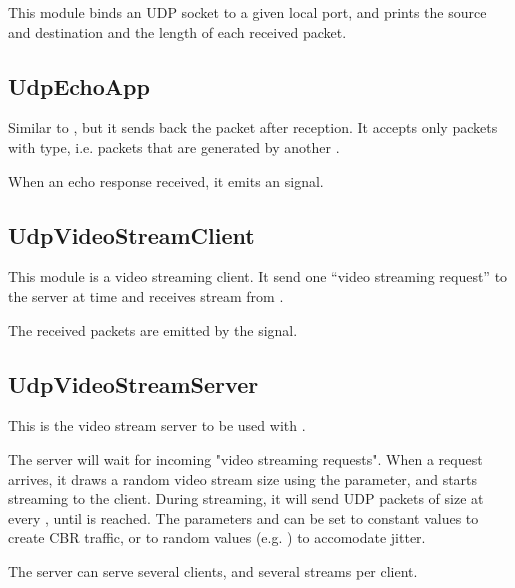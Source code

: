 This module binds an UDP socket to a given local port, and prints the
source and destination and the length of each received packet.


\subsection{UdpEchoApp}
\label{sec:apps:udpechoapp}

Similar to , but it sends back the packet after reception.
It accepts only packets with  type, i.e. packets that
are generated by another .

When an echo response received, it emits an  signal.

\subsection{UdpVideoStreamClient}
\label{sec:apps:udpvideostreamclient}

This module is a video streaming client. It send one ``video streaming request'' to
the server at time  and receives stream from .

The received packets are emitted by the  signal.

\subsection{UdpVideoStreamServer}
\label{sec:apps:udpvideostreamserver}

This is the video stream server to be used with .

The server will wait for incoming "video streaming requests".
When a request arrives, it draws a random video stream size
using the  parameter, and starts streaming to the client.
During streaming, it will send UDP packets of size  at every
, until  is reached. The parameters 
and  can be set to constant values to create CBR traffic,
or to random values (e.g. ) to
accomodate jitter.

The server can serve several clients, and several streams per client.


